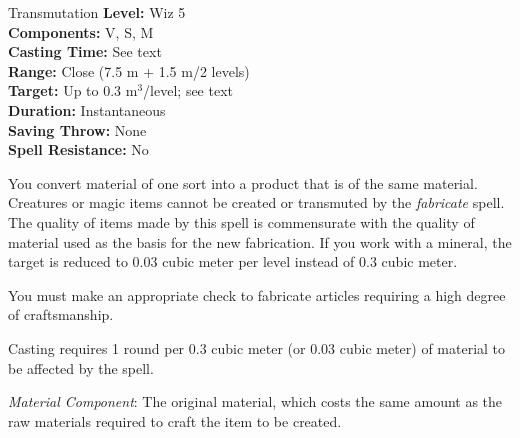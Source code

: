 {Transmutation}
{
	\textbf{Level:}
	Wiz 5\\
	\textbf{Components:}
	V, S, M\\
	\textbf{Casting Time:}
	See text\\
	\textbf{Range:}
	Close (7.5 m + 1.5 m/2 levels)\\
	\textbf{Target:}
	Up to 0.3 m$^3$/level; see text\\
	\textbf{Duration:}
	Instantaneous\\
	\textbf{Saving Throw:}
	None\\
	\textbf{Spell Resistance:}
	No\\
}
{
	You convert material of one sort into a product that is of the same material. Creatures or magic items cannot be created or transmuted by the \emph{fabricate} spell. The quality of items made by this spell is commensurate with the quality of material used as the basis for the new fabrication. If you work with a mineral, the target is reduced to 0.03 cubic meter per level instead of 0.3 cubic meter.

	You must make an appropriate  check to fabricate articles requiring a high degree of craftsmanship.

	Casting requires 1 round per 0.3 cubic meter (or 0.03 cubic meter) of material to be affected by the spell.

	\textit{Material Component}:
	The original material, which costs the same amount as the raw materials required to craft the item to be created.

}
